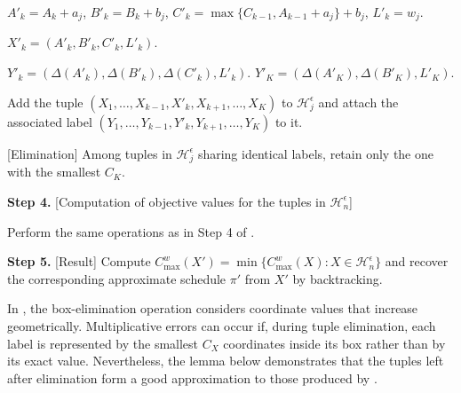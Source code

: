 \documentclass[12pt]{article}
\begin{document}
\begin{sloppypar}
\begin{algorithm}[H]
            {
                {
                    {
                        $A'_k = A_k+a_j$, $B'_k = B_k+b_j$, $C'_k = \max\{C_{k-1}, A_{k-1}+a_j\}+b_j$, $L'_k= w_j$. \;
                        
                        $X'_k=(A'_k, B'_k, C'_k, L'_k)$. \; 
                        
                        { 
                            $Y'_k=(\Delta(A'_k), \Delta(B'_k), \Delta(C'_k), L'_k)$. \;     
                        }
                        {
                            $Y'_K=(\Delta(A'_K), \Delta(B'_K), L'_K)$. \;
                        } 
                        
                        Add the tuple $(X_1, \ldots, X_{k-1}, X'_k, X_{k+1}, \ldots, X_K)$ to $\mathcal{H}_j^{\epsilon}$ and attach the associated label $(Y_1, \ldots, Y_{k-1}, Y'_k, Y_{k+1}, \ldots, Y_K)$ to it. \;
                    }
                }
                [Elimination] Among tuples in $\mathcal{H}_j^{\epsilon}$ sharing identical labels, retain only the one with the smallest $C_K$. \;
            }
            
            \textbf{Step 4.} [Computation of objective values for the tuples in $\mathcal{H}_n^{\epsilon}$]
            
            {
                Perform the same operations as in Step 4 of .
            }
            
            \textbf{Step 5.} [Result] Compute $C_{\max}^w(X')=\min \{C_{\max}^w(X): X \in \mathcal{H}_n^{\epsilon}\}$ and recover the corresponding approximate schedule $\pi'$ from $X'$ by backtracking. \;
            
        \end{algorithm}
        
        In , the box-elimination operation considers coordinate values that increase geometrically. Multiplicative errors can occur if, during tuple elimination, each label is represented by the smallest $C_X$ coordinates inside its box rather than by its exact value. Nevertheless, the lemma below demonstrates that the tuples left after elimination form a good approximation to those produced by .
        

\end{sloppypar}
\end{document}
